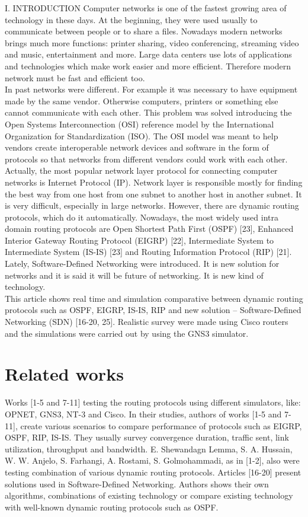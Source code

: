 \documentclass[conference,compsoc]{IEEEtran}
\begin{document}
I.	INTRODUCTION
Computer networks is one of the fastest growing area of technology in these days. At the beginning, they were used usually to communicate between people or to share a files. Nowadays modern networks brings much more functions: printer sharing, video conferencing, streaming video and music, entertainment and more. Large data centers use lots of applications and technologies which make work easier and more efficient. Therefore modern network must be fast and efficient too.
\\ \indent In past networks were different. For example it was necessary to have equipment made by the same vendor. Otherwise computers, printers or something else cannot communicate with each other. This problem was solved introducing the Open Systems Interconnection (OSI) reference model by the International Organization for Standardization (ISO). The OSI model was meant to help vendors create interoperable network devices and software in the form of protocols so that networks from different vendors could work with each other.
\\ \indent Actually, the most popular network layer protocol for connecting computer networks is Internet Protocol (IP). Network layer is responsible mostly for finding the best way from one host from one subnet to another host in another subnet. It is very difficult, especially in large networks. However, there are dynamic routing protocols, which do it automatically. Nowadays, the most widely used intra domain routing protocols are Open Shortest Path First (OSPF) [23], Enhanced Interior Gateway Routing Protocol (EIGRP) [22], Intermediate System to Intermediate System (IS-IS) [23] and Routing Information Protocol (RIP) [21]. Lately, Software-Defined Networking were introduced. It is new solution for networks and it is said it will be future of networking. It is new kind of technology.
\\ \indent This article shows real time and simulation comparative between dynamic routing protocols such as OSPF, EIGRP, IS-IS, RIP and new solution – Software-Defined Networking (SDN) [16-20, 25]. Realistic survey were made using Cisco routers and the simulations were carried out by using the GNS3 simulator.


\section{Related works}

Works [1-5 and 7-11] testing the routing protocols using different simulators, like: OPNET, GNS3, NT-3 and Cisco. In their studies, authors of works [1-5 and 7-11], create various scenarios to compare performance of protocols such as EIGRP, OSPF, RIP, IS-IS. They usually survey convergence duration, traffic sent, link utilization, throughput and bandwidth. E. Shewandagn Lemma, S. A. Hussain, W. W. Anjelo, S. Farhangi, A. Rostami, S. Golmohammadi, as in [1-2], also were testing combination of various dynamic routing protocols. Articles [16-20] present solutions used in Software-Defined Networking. Authors shows their own algorithms, combinations of existing technology or compare existing technology with well-known dynamic routing protocols such as OSPF.
\end{document}
